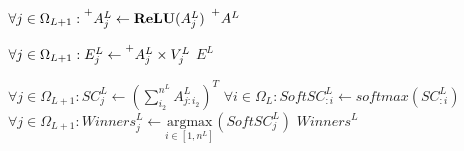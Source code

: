 {\begin{algorithm}[H]
\begin{algorithmic}[1]
    \State $\forall j \in \Omega_{L+1}:  \prescript{+}{}{A^{L}_j} \gets \mathbf{ReLU}(A^L_j)$  \label{op:method3_max_pointwise_relu_this_op_may_be_different}
    \State \Return $\prescript{+}{}{A^{L}}$ 
    \EndProcedure

      
    \State $\forall j \in \Omega_{L+1}: E^L_j \gets \prescript{+}{}{A_j^L} \times V_j^L$  \label{op:method3_max_weighted_sum} %
    \State \Return $E^L$ 
    \EndProcedure

     
    \State $\forall j \in \Omega_{L+1}: SC_j^L \gets (\sum_{i_2}^{n^L} A^L_{j:i_2})^T$  \label{op:method3_max_sum_of_vector_columns} %
    \State {}
    \State $\forall i \in \Omega_L: SoftSC_{:i}^L \gets softmax(SC^L_{:i})$  \label{op:method3_max_softmax_like_previous_softmax}
    \State $\forall j \in \Omega_{L+1}: Winners_j^L \gets \underset{i \in [1,n^L]}{\mathrm{argmax}}(SoftSC_j^L)$ \label{op:method3_max_argmax_say_that_input_is_a_column}
    \State \Return $Winners^L$ 
    \EndProcedure

  \end{algorithmic}
  \end{algorithm}
}

